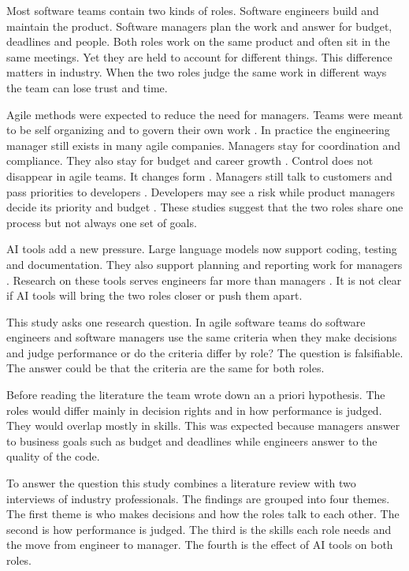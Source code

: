 \documentclass[conference]{IEEEtran}
\begin{document}
Most software teams contain two kinds of roles. Software engineers build and maintain the product. Software managers plan the work and answer for budget, deadlines and people. Both roles work on the same product and often sit in the same meetings. Yet they are held to account for different things. This difference matters in industry. When the two roles judge the same work in different ways the team can lose trust and time.

Agile methods were expected to reduce the need for managers. Teams were meant to be self organizing and to govern their own work \cite{wagenaar2018}. In practice the engineering manager still exists in many agile companies. Managers stay for coordination and compliance. They also stay for budget and career growth \cite{kalluri2025}. Control does not disappear in agile teams. It changes form \cite{kurt2024}. Managers still talk to customers and pass priorities to developers \cite{knauss2018}. Developers may see a risk while product managers decide its priority and budget \cite{weir2023}. These studies suggest that the two roles share one process but not always one set of goals.

AI tools add a new pressure. Large language models now support coding, testing and documentation. They also support planning and reporting work for managers \cite{assalaarachchi2025}. Research on these tools serves engineers far more than managers \cite{zhang2026}. It is not clear if AI tools will bring the two roles closer or push them apart.

This study asks one research question. In agile software teams do software engineers and software managers use the same criteria when they make decisions and judge performance or do the criteria differ by role? The question is falsifiable. The answer could be that the criteria are the same for both roles.

Before reading the literature the team wrote down an a priori hypothesis. The roles would differ mainly in decision rights and in how performance is judged. They would overlap mostly in skills. This was expected because managers answer to business goals such as budget and deadlines while engineers answer to the quality of the code.

To answer the question this study combines a literature review with two interviews of industry professionals. The findings are grouped into four themes. The first theme is who makes decisions and how the roles talk to each other. The second is how performance is judged. The third is the skills each role needs and the move from engineer to manager. The fourth is the effect of AI tools on both roles.
\end{document}
